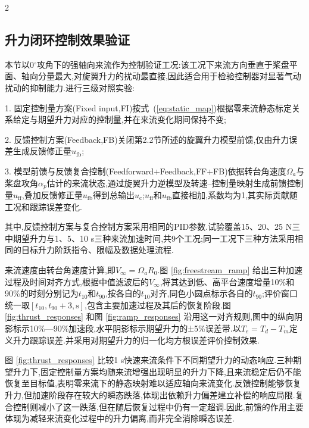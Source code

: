 \documentclass{aas}
\begin{document}
\begin{multicols}{2}
    
\subsection{升力闭环控制效果验证}
\label{subsec:control_verif}

\textcolor{mygreen}{本节以0$^{\circ}$攻角下的强轴向来流作为控制验证工况}:该工况下来流方向垂直于桨盘平面、轴向分量最大,对旋翼升力的扰动最直接,因此适合用于检验控制器对显著气动扰动的抑制能力.进行三级对照实验:

1. 固定控制量方案(\textcolor{mygreen}{Fixed input,FI})按式~(\ref{eq:static_map})根据零来流静态标定关系给定与期望升力对应的控制量,并在来流变化期间保持不变;

2. 反馈控制方案(Feedback,FB)关闭第2.2节所述的旋翼升力模型前馈,仅由升力误差生成反馈修正量$u_{\mathrm{fb}}$;

3. 模型前馈与反馈复合控制(Feedforward+Feedback,FF+FB)依据转台角速度$\Omega_a$与桨盘攻角$\alpha_p$估计的来流状态,通过旋翼升力逆模型及转速--控制量映射生成前馈控制量$u_{\mathrm{ff}}$,叠加反馈修正量$u_{\mathrm{fb}}$得到总输出$u_{\mathrm{c}}$;$u_{\mathrm{ff}}$和$u_{\mathrm{fb}}$直接相加,系数均为1,其实际贡献随工况和跟踪误差变化.

其中,反馈控制方案与复合控制方案采用相同的PID参数.试验覆盖15、20、25 N三中期望升力与1、5、10 s三种来流加速时间,共9个工况;同一工况下三种方法采用相同的目标升力阶跃指令、限幅及数据处理流程.

\textcolor{mygreen}{来流速度由转台角速度计算,即$V_\infty=\Omega_a R_0$.图 \ref{fig:freestream_ramp} 给出三种加速过程及时间对齐方式,根据中值滤波后的$V_\infty$,将其达到低、高平台速度增量10\%和90\%的时刻分别记为$t_{10}$和$t_{90}$,按各自的$t_{10}$对齐,同色小圆点标示各自的$t_{90}$;评价窗口统一取$[t_{10},t_{90}+3,\mathrm{s}]$,包含主要加速过程及其后的恢复阶段.图 \ref{fig:thrust_responses} 和图 \ref{fig:ramp_responses} 沿用这一对齐规则,图中的纵向阴影标示10\%—90\%加速段,水平阴影标示期望升力的±5\%误差带.以$T_e=T_d-T_m$定义升力跟踪误差.并采用对期望升力的归一化均方根误差评价控制效果.}

图 \ref{fig:thrust_responses} 比较1 s快速来流条件下不同期望升力的动态响应.三种期望升力下,固定控制量方案均随来流增强出现明显的升力下降,且来流稳定后仍不能恢复至目标值,表明零来流下的静态映射难以适应轴向来流变化.反馈控制能够恢复升力,但加速阶段存在较大的瞬态跌落,体现出依赖升力偏差建立补偿的响应局限.复合控制则减小了这一跌落,但在随后恢复过程中仍有一定超调.因此,前馈的作用主要体现为减轻来流变化过程中的升力偏离,而非完全消除瞬态误差.

\end{multicols}
\end{document}
